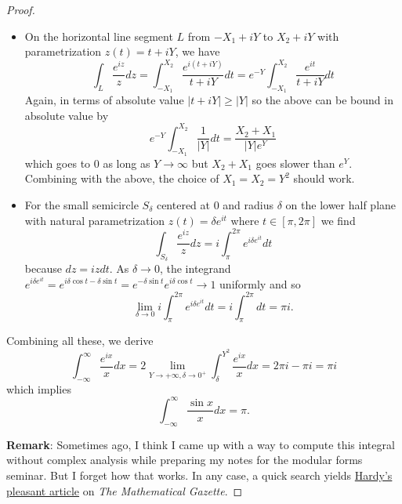 \documentclass[12pt]{article}
\begin{document}
\begin{proof}
\begin{itemize}
\item On the horizontal line segment $L$ from $-X_1 + iY$ to $X_2 + iY$ with parametrization $z(t) = t + iY$, we have
$$\int_{L} \frac{e^{iz}}{z} dz = \int_{-X_1}^{X_2} \frac{e^{i(t + iY)}}{t + iY} dt = e^{-Y} \int_{-X_1}^{X_2} \frac{e^{it}}{t + iY} dt$$
Again, in terms of absolute value $|t + iY| \geq |Y|$ so the above can be bound in absolute value by
$$e^{-Y} \int_{-X_1}^{X_2} \frac{1}{|Y|} dt = \frac{X_2 + X_1}{|Y| e^Y}$$
which goes to 0 as long as $Y \rightarrow \infty$ but $X_2 + X_1$ goes slower than $e^Y$. Combining with the above, the choice of $X_1 = X_2 = Y^2$ should work.

\item For the small semicircle $S_\delta$ centered at $0$ and radius $\delta$ on the lower half plane with natural parametrization $z(t) = \delta e^{it}$ where $t \in [\pi, 2\pi]$ we find
$$\int_{S_\delta} \frac{e^{iz}}{z} dz = i \int_\pi^{2\pi} e^{i \delta e^{it}} dt$$
because $dz = i z dt$. As $\delta \rightarrow 0$, the integrand $e^{i \delta e^{it}} = e^{i \delta \cos t - \delta \sin t} = e^{-\delta \sin t} e^{i \delta \cos t} \rightarrow 1$ uniformly and so
$$\lim_{\delta \rightarrow 0} i \int_\pi^{2\pi} e^{i \delta e^{it}} dt = i \int_\pi^{2\pi} dt = \pi i.$$
\end{itemize}

Combining all these, we derive
$$\int_{-\infty}^{\infty} \frac{e^{ix}}{x} dx = 2 \lim_{Y \rightarrow +\infty, \delta \rightarrow 0^+} \int_\delta^{Y^2} \frac{e^{ix}}{x} dx = 2 \pi i - \pi i = \pi i$$
which implies
$$\int_{-\infty}^{\infty} \frac{\sin x}{x} dx = \pi.$$

\textbf{Remark}: Sometimes ago, I think I came up with a way to compute this integral without complex analysis while preparing my notes for the modular forms seminar. But I forget how that works. In any case, a quick search yields \href{https://people.math.harvard.edu/~ctm/home/text/others/hardy/sinx/sinx.pdf}{Hardy's pleasant article} on \textit{The Mathematical Gazette}.
\end{proof}

\unless\ifdefined\IsMainDocument
\end{document}
